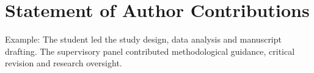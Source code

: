 \chapter*{Statement of Author Contributions}


Example: The student led the study design, data analysis and manuscript drafting.
The supervisory panel contributed methodological guidance, critical revision and
research oversight.

